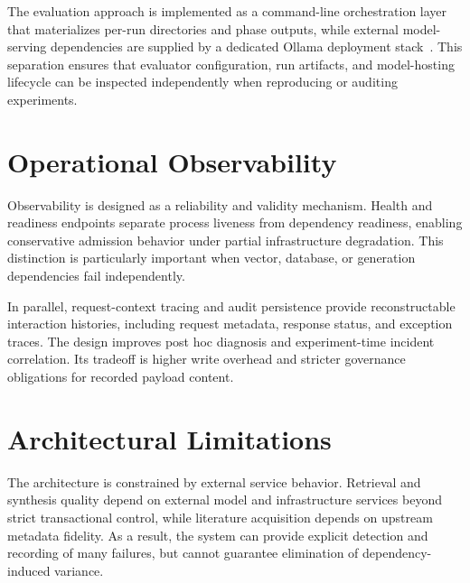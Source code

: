 The evaluation approach is implemented as a command-line orchestration layer that materializes per-run directories and phase outputs, while external model-serving dependencies are supplied by a dedicated Ollama deployment stack~\cite{ollama2026api}. This separation ensures that evaluator configuration, run artifacts, and model-hosting lifecycle can be inspected independently when reproducing or auditing experiments.

\section{Operational Observability}

Observability is designed as a reliability and validity mechanism. Health and readiness endpoints separate process liveness from dependency readiness, enabling conservative admission behavior under partial infrastructure degradation. This distinction is particularly important when vector, database, or generation dependencies fail independently.

In parallel, request-context tracing and audit persistence provide reconstructable interaction histories, including request metadata, response status, and exception traces. The design improves post hoc diagnosis and experiment-time incident correlation. Its tradeoff is higher write overhead and stricter governance obligations for recorded payload content.

\section{Architectural Limitations}

The architecture is constrained by external service behavior. Retrieval and synthesis quality depend on external model and infrastructure services beyond strict transactional control, while literature acquisition depends on upstream metadata fidelity. As a result, the system can provide explicit detection and recording of many failures, but cannot guarantee elimination of dependency-induced variance.

